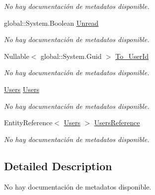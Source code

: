 \begin{DoxyCompactItemize}
\begin{DoxyCompactList}\small\item\em No hay documentación de metadatos disponible. \end{DoxyCompactList}\item 
global\-::\-System.\-Boolean \hyperlink{class_microsoft_1_1_samples_1_1_kinect_1_1_basic_interactions_1_1_inboxes_a7f3876341272c5589bcd87e5f722fa2e}{Unread}
\begin{DoxyCompactList}\small\item\em No hay documentación de metadatos disponible. \end{DoxyCompactList}\item 
Nullable$<$ global\-::\-System.\-Guid $>$ \hyperlink{class_microsoft_1_1_samples_1_1_kinect_1_1_basic_interactions_1_1_inboxes_a86fe44c783b095e4227b80c75a2f221a}{To\-\_\-\-User\-Id}
\begin{DoxyCompactList}\small\item\em No hay documentación de metadatos disponible. \end{DoxyCompactList}\item 
\hyperlink{class_microsoft_1_1_samples_1_1_kinect_1_1_basic_interactions_1_1_users}{Users} \hyperlink{class_microsoft_1_1_samples_1_1_kinect_1_1_basic_interactions_1_1_inboxes_ad8f9920839070567baff9073d0cec2e4}{Users}
\begin{DoxyCompactList}\small\item\em No hay documentación de metadatos disponible. \end{DoxyCompactList}\item 
Entity\-Reference$<$ \hyperlink{class_microsoft_1_1_samples_1_1_kinect_1_1_basic_interactions_1_1_users}{Users} $>$ \hyperlink{class_microsoft_1_1_samples_1_1_kinect_1_1_basic_interactions_1_1_inboxes_ae687e52fcbefd39163128ea6e4977237}{Users\-Reference}
\begin{DoxyCompactList}\small\item\em No hay documentación de metadatos disponible. \end{DoxyCompactList}\end{DoxyCompactItemize}


\subsection{Detailed Description}
No hay documentación de metadatos disponible. 



